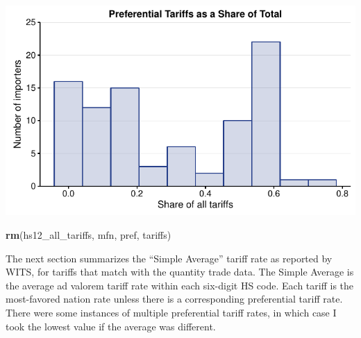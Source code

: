 \documentclass[10pt,]{article}
\newenvironment{Shaded}{\begin{snugshade}}{\end{snugshade}}
\newcommand{\KeywordTok}[1]{\textcolor[rgb]{0.13,0.29,0.53}{\textbf{{#1}}}}
\newcommand{\NormalTok}[1]{{#1}}
\begin{document}
\begin{center}\includegraphics{Figs/pref_summary-1} \end{center}

\begin{Shaded}
\begin{Highlighting}[]
\KeywordTok{rm}\NormalTok{(hs12_all_tariffs, mfn, pref, tariffs)}
\end{Highlighting}
\end{Shaded}

The next section summarizes the ``Simple Average'' tariff rate as
reported by WITS, for tariffs that match with the quantity trade data.
The Simple Average is the average ad valorem tariff rate within each
six-digit HS code. Each tariff is the most-favored nation rate unless
there is a corresponding preferential tariff rate. There were some
instances of multiple preferential tariff rates, in which case I took
the lowest value if the average was different.
\end{document}
